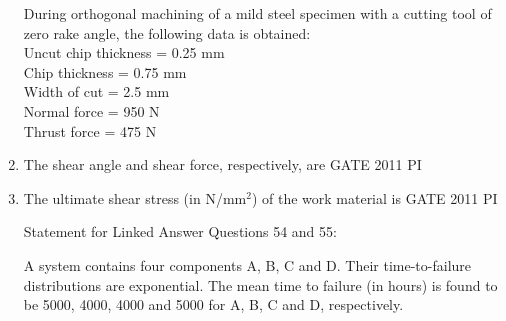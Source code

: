 \documentclass[journal,12pt,onecolumn]{IEEEtran}
\theoremstyle{remark}
\begin{document}
\begin{enumerate}
During orthogonal machining of a mild steel specimen with a cutting tool of zero rake angle, the following data is obtained:\\
Uncut chip thickness = 0.25 mm\\
Chip thickness = 0.75 mm\\
Width of cut = 2.5 mm\\
Normal force = 950 N\\
Thrust force = 475 N

\item The shear angle and shear force, respectively, are
\hfill{GATE 2011 PI}
\begin{enumerate}
\end{enumerate}

\item The ultimate shear stress (in N/mm$^2$) of the work material is
\hfill{GATE 2011 PI}
\begin{enumerate}
\end{enumerate}

Statement for Linked Answer Questions 54 and 55:

A system contains four components A, B, C and D. Their time-to-failure distributions are exponential. The mean time to failure (in hours) is found to be 5000, 4000, 4000 and 5000 for A, B, C and D, respectively.


\end{enumerate}
\end{document}
